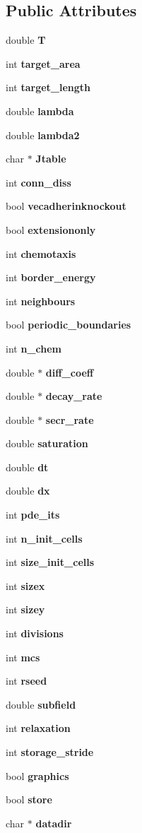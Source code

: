 \subsection*{Public Attributes}
\begin{DoxyCompactItemize}
\item 
double {\bf T}
\item 
int {\bf target\-\_\-area}
\item 
int {\bf target\-\_\-length}
\item 
double {\bf lambda}
\item 
double {\bf lambda2}
\item 
char $\ast$ {\bf Jtable}
\item 
int {\bf conn\-\_\-diss}
\item 
bool {\bf vecadherinknockout}
\item 
bool {\bf extensiononly}
\item 
int {\bf chemotaxis}
\item 
int {\bf border\-\_\-energy}
\item 
int {\bf neighbours}
\item 
bool {\bf periodic\-\_\-boundaries}
\item 
int {\bf n\-\_\-chem}
\item 
double $\ast$ {\bf diff\-\_\-coeff}
\item 
double $\ast$ {\bf decay\-\_\-rate}
\item 
double $\ast$ {\bf secr\-\_\-rate}
\item 
double {\bf saturation}
\item 
double {\bf dt}
\item 
double {\bf dx}
\item 
int {\bf pde\-\_\-its}
\item 
int {\bf n\-\_\-init\-\_\-cells}
\item 
int {\bf size\-\_\-init\-\_\-cells}
\item 
int {\bf sizex}
\item 
int {\bf sizey}
\item 
int {\bf divisions}
\item 
int {\bf mcs}
\item 
int {\bf rseed}
\item 
double {\bf subfield}
\item 
int {\bf relaxation}
\item 
int {\bf storage\-\_\-stride}
\item 
bool {\bf graphics}
\item 
bool {\bf store}
\item 
char $\ast$ {\bf datadir}
\end{DoxyCompactItemize}


